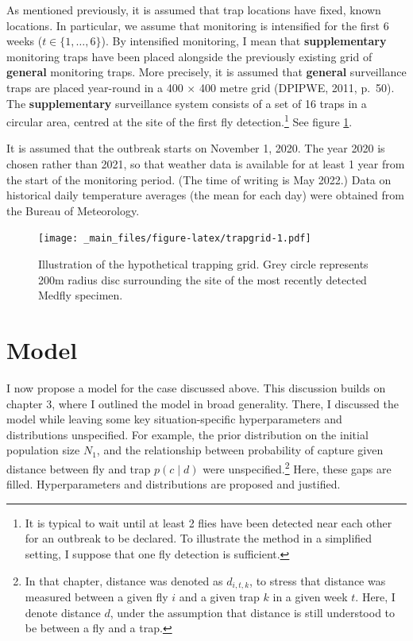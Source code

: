 \documentclass[
  oneside]{book}
\begin{document}
As mentioned previously, it is assumed that trap locations have fixed, known locations. In particular, we assume that monitoring is intensified for the first 6 weeks (\(t \in \{1, \ldots, 6\}\)). By intensified monitoring, I mean that \textbf{supplementary} monitoring traps have been placed alongside the previously existing grid of \textbf{general} monitoring traps. More precisely, it is assumed that \textbf{general} surveillance traps are placed year-round in a 400 \(\times\) 400 metre grid (DPIPWE, 2011, p.~50). The \textbf{supplementary} surveillance system consists of a set of 16 traps in a circular area, centred at the site of the first fly detection.\footnote{It is typical to wait until at least 2 flies have been detected near each other for an outbreak to be declared. To illustrate the method in a simplified setting, I suppose that one fly detection is sufficient.} See figure \ref{fig:trapgrid}.

It is assumed that the outbreak starts on November 1, 2020. The year 2020 is chosen rather than 2021, so that weather data is available for at least 1 year from the start of the monitoring period. (The time of writing is May 2022.) Data on historical daily temperature averages (the mean for each day) were obtained from the Bureau of Meteorology.

\begin{figure}
\centering
\texttt{[image: \_main\_files/figure-latex/trapgrid-1.pdf]}
\caption{\label{fig:trapgrid}Illustration of the hypothetical trapping grid. Grey circle represents 200m radius disc surrounding the site of the most recently detected Medfly specimen.}
\end{figure}

\hypertarget{model}{%
\section{Model}\label{model}}

I now propose a model for the case discussed above. This discussion builds on chapter 3, where I outlined the model in broad generality. There, I discussed the model while leaving some key situation-specific hyperparameters and distributions unspecified. For example, the prior distribution on the initial population size \(N_1\), and the relationship between probability of capture given distance between fly and trap \(p(c \mid d)\) were unspecified.\footnote{In that chapter, distance was denoted as \(d_{i,t,k}\), to stress that distance was measured between a given fly \(i\) and a given trap \(k\) in a given week \(t\). Here, I denote distance \(d\), under the assumption that distance is still understood to be between a fly and a trap.} Here, these gaps are filled. Hyperparameters and distributions are proposed and justified.
\end{document}
